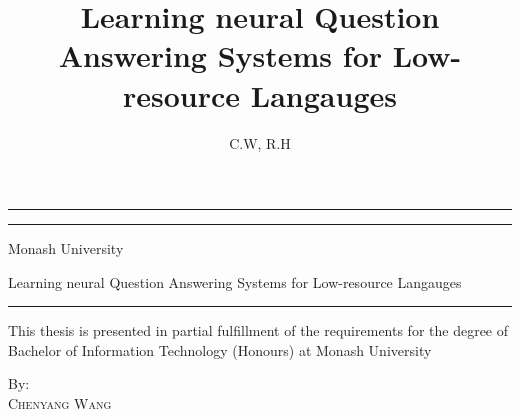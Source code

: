 \documentclass[]{article}
\title{Learning neural Question Answering Systems for Low-resource Langauges}
\author{C.W, R.H}
\begin{document}
\begin{titlepage} %
	
	\centering %
	
	
	\rule{\textwidth}{1pt} %
	
	\vspace{2pt}\vspace{-\baselineskip} %
	
	\rule{\textwidth}{0.4pt} %
	
	\vspace{0.1\textheight} %
	
	
	{\Huge Monash University}\\[0.5\baselineskip] %
	
	\vspace{0.1\textheight}
	
	{\Large Learning neural Question Answering Systems for Low-resource Langauges}\\[0.5\baselineskip] %
	
	\vspace{0.025\textheight} %
	
	\rule{0.3\textwidth}{0.4pt} %
	
	\vspace{0.15\textheight} %
	
	
	{This thesis is presented in partial fulfillment of the requirements for the degree of Bachelor of Information Technology (Honours) at Monash University}
	
	\vspace{0.05\textheight}
	
	{By:}\\
	\vspace{0.01\textheight}
	{\Large \textsc{Chenyang Wang}} %
	\vspace{0.05\textheight}
	

\end{titlepage}
\end{document}
